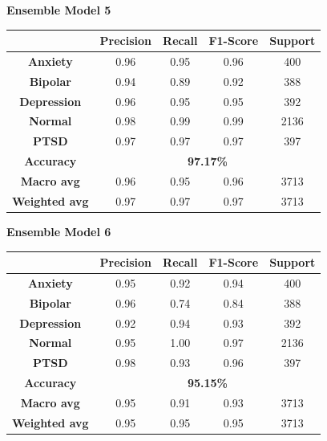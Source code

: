 \pagebreak


\begin{center}
    \textbf{Ensemble Model 5} \\[0.2em]
    \begin{tabular}{|c|c|c|c|c|}
        \hline
        & \textbf{Precision} & \textbf{Recall} & \textbf{F1-Score} & \textbf{Support} \\ \hline
        \textbf{Anxiety}    & 0.96 & 0.95 & 0.96 & 400 \\ \hline
        \textbf{Bipolar}    & 0.94 & 0.89 & 0.92 & 388 \\ \hline
        \textbf{Depression} & 0.96 & 0.95 & 0.95 & 392 \\ \hline
        \textbf{Normal}     & 0.98 & 0.99 & 0.99 & 2136 \\ \hline
        \textbf{PTSD}       & 0.97 & 0.97 & 0.97 & 397 \\ \hline
        \textbf{Accuracy}   & \multicolumn{4}{c|}{\textbf{97.17\%}} \\ \hline
        \textbf{Macro avg}  & 0.96 & 0.95 & 0.96 & 3713 \\ \hline
        \textbf{Weighted avg} & 0.97 & 0.97 & 0.97 & 3713 \\ \hline
    \end{tabular}
\end{center}


\begin{center}
    \textbf{Ensemble Model 6} \\[0.2em]
    \begin{tabular}{|c|c|c|c|c|}
        \hline
        & \textbf{Precision} & \textbf{Recall} & \textbf{F1-Score} & \textbf{Support} \\ \hline
        \textbf{Anxiety}    & 0.95 & 0.92 & 0.94 & 400 \\ \hline
        \textbf{Bipolar}    & 0.96 & 0.74 & 0.84 & 388 \\ \hline
        \textbf{Depression} & 0.92 & 0.94 & 0.93 & 392 \\ \hline
        \textbf{Normal}     & 0.95 & 1.00 & 0.97 & 2136 \\ \hline
        \textbf{PTSD}       & 0.98 & 0.93 & 0.96 & 397 \\ \hline
        \textbf{Accuracy}   & \multicolumn{4}{c|}{\textbf{95.15\%}} \\ \hline
        \textbf{Macro avg}  & 0.95 & 0.91 & 0.93 & 3713 \\ \hline
        \textbf{Weighted avg} & 0.95 & 0.95 & 0.95 & 3713 \\ \hline
    \end{tabular}
\end{center}


